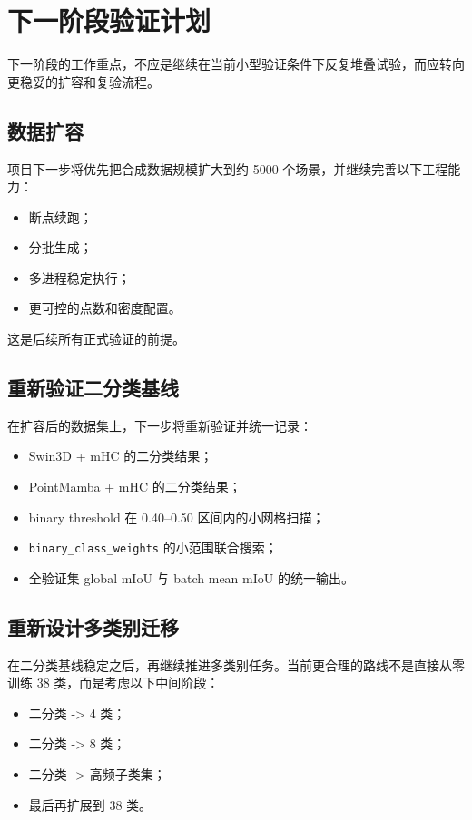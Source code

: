 \documentclass[12pt]{ctexart}
\begin{document}
\section{下一阶段验证计划}

下一阶段的工作重点，不应是继续在当前小型验证条件下反复堆叠试验，而应转向更稳妥的扩容和复验流程。

\subsection{数据扩容}

项目下一步将优先把合成数据规模扩大到约 5000 个场景，并继续完善以下工程能力：

\begin{itemize}
  \item 断点续跑；
  \item 分批生成；
  \item 多进程稳定执行；
  \item 更可控的点数和密度配置。
\end{itemize}

这是后续所有正式验证的前提。

\subsection{重新验证二分类基线}

在扩容后的数据集上，下一步将重新验证并统一记录：

\begin{itemize}
  \item Swin3D + mHC 的二分类结果；
  \item PointMamba + mHC 的二分类结果；
  \item binary threshold 在 0.40--0.50 区间内的小网格扫描；
  \item \texttt{binary\_class\_weights} 的小范围联合搜索；
  \item 全验证集 global mIoU 与 batch mean mIoU 的统一输出。
\end{itemize}

\subsection{重新设计多类别迁移}

在二分类基线稳定之后，再继续推进多类别任务。当前更合理的路线不是直接从零训练 38 类，而是考虑以下中间阶段：

\begin{itemize}
  \item 二分类 -> 4 类；
  \item 二分类 -> 8 类；
  \item 二分类 -> 高频子类集；
  \item 最后再扩展到 38 类。
\end{itemize}
\end{document}
